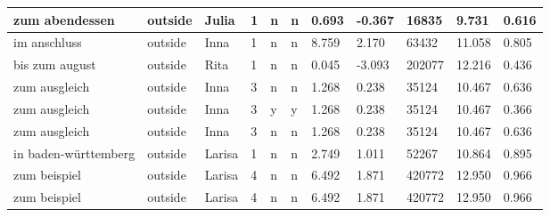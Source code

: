 \begin{longtable}{|p{4cm}|p{1cm}|p{1.2cm}|p{0.5cm}|p{0.5cm}|p{0.5cm}|R{1cm}|R{1cm}|R{1cm}|R{1cm}|R{1cm}|}
zum abendessen             & outside           & Julia         & 1                                   & n                          & n                          & 0.693      & -0.367        & 16835                   & 9.731                         & 0.616                   \\ \hline
im anschluss               & outside           & Inna          & 1                                   & n                          & n                          & 8.759      & 2.170         & 63432                   & 11.058                        & 0.805                   \\ \hline
bis zum august             & outside           & Rita          & 1                                   & n                          & n                          & 0.045      & -3.093        & 202077                  & 12.216                        & 0.436                   \\ \hline
zum ausgleich              & outside           & Inna          & 3                                   & n                          & n                          & 1.268      & 0.238         & 35124                   & 10.467                        & 0.636                   \\ \hline
zum ausgleich              & outside           & Inna          & 3                                   & y                          & y                          & 1.268      & 0.238         & 35124                   & 10.467                        & 0.366                   \\ \hline
zum ausgleich              & outside           & Inna          & 3                                   & n                          & n                          & 1.268      & 0.238         & 35124                   & 10.467                        & 0.636                   \\ \hline
in baden-w\"{u}rttemberg   & outside           & Larisa        & 1                                   & n                          & n                          & 2.749      & 1.011         & 52267                   & 10.864                        & 0.895                   \\ \hline
zum beispiel               & outside           & Larisa        & 4                                   & n                          & n                          & 6.492      & 1.871         & 420772                  & 12.950                        & 0.966                   \\ \hline
zum beispiel               & outside           & Larisa        & 4                                   & n                          & n                          & 6.492      & 1.871         & 420772                  & 12.950                        & 0.966                   \\ \hline

\end{longtable}
